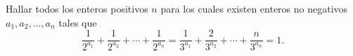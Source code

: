 Hallar todos los enteros positivos $n$ para los cuales existen enteros no negativos
$a_1,a_2,\dots,a_n$ tales que
\[\frac{1}{2^{a_1}} + \frac{1}{2^{a_2}} + \cdots + \frac{1}{2^{a_n}} =
\frac{1}{3^{a_1}} + \frac{2}{3^{a_2}} + \cdots + \frac{n}{3^{a_n}} = 1.
\]